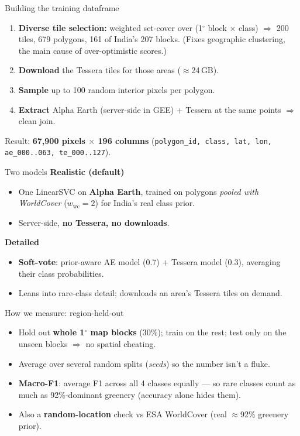 \documentclass[aspectratio=169]{beamer}
\begin{document}
\begin{frame}{Building the training dataframe}
\begin{enumerate}
  \item \textbf{Diverse tile selection:} weighted set-cover over (1$^\circ$ block
  $\times$ class) $\Rightarrow$ 200 tiles, 679 polygons, 161 of India's 207 blocks.
  (Fixes geographic clustering, the main cause of over-optimistic scores.)
  \item \textbf{Download} the Tessera tiles for those areas ($\approx$24\,GB).
  \item \textbf{Sample} up to 100 random interior pixels per polygon.
  \item \textbf{Extract} Alpha Earth (server-side in GEE) + Tessera at the same
  points $\Rightarrow$ clean join.
\end{enumerate}
\vspace{0.5em}
Result: \textbf{67{,}900 pixels $\times$ 196 columns}
(\texttt{polygon\_id, class, lat, lon, ae\_000..063, te\_000..127}).
\end{frame}

\begin{frame}{Two models}
\textbf{Realistic (default)}
\begin{itemize}
  \item One LinearSVC on \textbf{Alpha Earth}, trained on polygons \emph{pooled with
  WorldCover} ($w_{\text{wc}}{=}2$) for India's real class prior.
  \item Server-side, \textbf{no Tessera, no downloads}.
\end{itemize}
\vspace{0.5em}
\textbf{Detailed}
\begin{itemize}
  \item \textbf{Soft-vote}: prior-aware AE model (0.7) $+$ Tessera model (0.3),
  averaging their class probabilities.
  \item Leans into rare-class detail; downloads an area's Tessera tiles on demand.
\end{itemize}
\end{frame}

\begin{frame}{How we measure: region-held-out}
\begin{itemize}
  \item Hold out \textbf{whole 1$^\circ$ map blocks} (30\%); train on the rest; test
  only on the unseen blocks $\Rightarrow$ no spatial cheating.
  \item Average over several random splits (\emph{seeds}) so the number isn't a
  fluke.
  \item \textbf{Macro-F1}: average F1 across all 4 classes equally --- so rare
  classes count as much as 92\%-dominant greenery (accuracy alone hides them).
  \item Also a \textbf{random-location} check vs ESA WorldCover (real $\approx$92\%
  greenery prior).
\end{itemize}
\end{frame}
\end{document}
